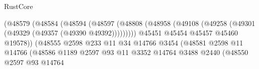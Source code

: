 \begin{lexlean}{RustCore}
\begin{coremodule}
                                                  (@48579
                                                    (@48584
                                                      (@48594
                                                        (@48597
                                                          (@48808
                                                            (@48958
                                                              (@49108
                                                                (@49258
                                                                  (@49301
                                                                    (@49329
                                                                      (@49357
                                                                        (@49390 @49392)))))))))
                                                        @45451
                                                        @45454
                                                        @45457
                                                        @45460
                                                        @19578))
                                                    (@48555
                                                      @2598
                                                      @233
                                                      @11
                                                      @34
                                                      @14766
                                                      @3454
                                                      (@48581
                                                        @2598
                                                        @11
                                                        @14766
                                                        (@48586
                                                          @1189
                                                          @2597
                                                          @93
                                                          @11
                                                          @3352
                                                          @14764
                                                          @3488
                                                          @2440
                                                          (@48550
                                                            @2597
                                                            @93
                                                            @14764

\end{coremodule}
\end{lexlean}

